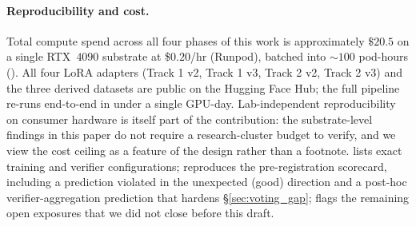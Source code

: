 \paragraph{Reproducibility and cost.}
Total compute spend across all four phases of this work is
approximately $\$20.5$ on a single RTX~$4090$ substrate at
\$$0.20$/hr (Runpod), batched into $\sim 100$ pod-hours
().  All four LoRA adapters (Track 1 v2,
Track 1 v3, Track 2 v2, Track 2 v3) and the three derived datasets
are public on the Hugging Face Hub; the full pipeline
re-runs end-to-end in under a single GPU-day.  Lab-independent
reproducibility on consumer hardware is itself part of the
contribution: the substrate-level findings in this paper do not
require a research-cluster budget to verify, and we view the cost
ceiling as a feature of the design rather than a footnote.
 lists exact training and verifier
configurations;  reproduces the
pre-registration scorecard, including a prediction violated in the
unexpected (good) direction and a post-hoc verifier-aggregation
prediction that hardens \S\ref{sec:voting_gap};
 flags the remaining open exposures that we did
not close before this draft.
